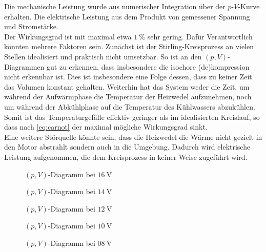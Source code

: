 Die mechanische Leistung wurde aus numerischer Integration über der $ p $-$ V $-Kurve erhalten. Die elektrische Leistung aus dem Produkt von gemessener Spannung und Stromstärke.\\
Der Wirkungsgrad ist mit maximal etwa $ \SI{1}{\percent} $ sehr gering. Dafür Verantwortlich könnten mehrere Faktoren sein. Zunächst ist der Stirling-Kreisprozess an vielen Stellen idealisiert und praktisch nicht umsetzbar. So ist an den $ (p,V) $-Diagrammen gut zu erkennen, dass insbesondere die isochore (de)kompression nicht erkennbar ist. Dies ist insbesondere eine Folge dessen, dass zu keiner Zeit das Volumen konstant gehalten. Weiterhin hat das System weder die Zeit, um während der Aufwärmphase die Temperatur der Heizwedel aufzunehmen, noch um während der Abkühlphase auf die Temperatur des Kühlwassers abzukühlen. Somit ist das Temperaturgefälle effektiv geringer als im idealisierten Kreislauf, so dass nach \ref{eq:carnot} der maximal mögliche Wirkungsgrad sinkt. \\
Eine weitere Störquelle könnte sein, dass die Heizwedel die Wärme nicht gezielt in den Motor abstrahlt sondern auch in die Umgebung. Dadurch wird elektrische Leistung aufgenommen, die dem Kreisprozess in keiner Weise zugeführt wird.
\begin{figure}[h!]
	\centering
	
	\caption{$ (p,V) $-Diagramm bei $ \SI{16}{\volt} $}
	\label{fig:pV16}
\end{figure}
\begin{figure}[h!]
	\centering
	
	\caption{$ (p,V) $-Diagramm bei $ \SI{14}{\volt} $}
	\label{fig:pV14}
\end{figure}
\begin{figure}[h!]
	\centering
	
	\caption{$ (p,V) $-Diagramm bei $ \SI{12}{\volt} $}
	\label{fig:pV12}
\end{figure}
\begin{figure}[h!]
	\centering
	
	\caption{$ (p,V) $-Diagramm bei $ \SI{10}{\volt} $}
	\label{fig:pV10}
\end{figure}
\begin{figure}[h!]
	\centering
	
	\caption{$ (p,V) $-Diagramm bei $ \SI{08}{\volt} $}
	\label{fig:pV08}
\end{figure}

